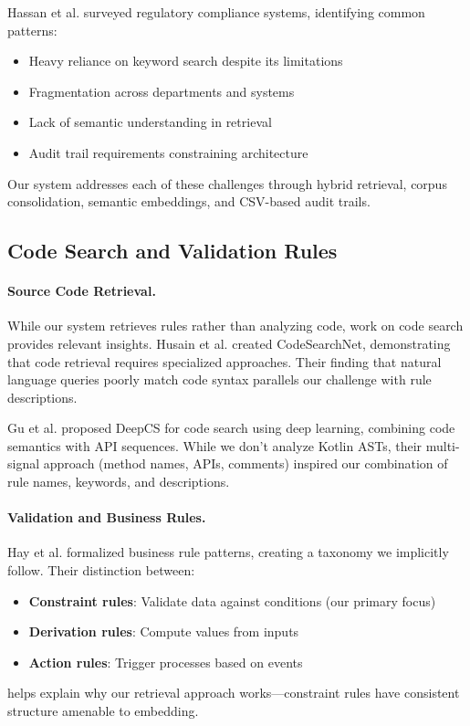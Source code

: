 Hassan et al. \cite{hassan2022regulatory} surveyed regulatory compliance systems, identifying common patterns:
\begin{itemize}[leftmargin=*,itemsep=2pt,topsep=2pt]
 \item Heavy reliance on keyword search despite its limitations
 \item Fragmentation across departments and systems
 \item Lack of semantic understanding in retrieval
 \item Audit trail requirements constraining architecture
\end{itemize}
Our system addresses each of these challenges through hybrid retrieval, corpus consolidation, semantic embeddings, and CSV-based audit trails.

\subsection{Code Search and Validation Rules}

\paragraph{Source Code Retrieval.} While our system retrieves rules rather than analyzing code, work on code search provides relevant insights. Husain et al. \cite{husain2019codesearchnet} created CodeSearchNet, demonstrating that code retrieval requires specialized approaches. Their finding that natural language queries poorly match code syntax parallels our challenge with rule descriptions.

Gu et al. \cite{gu2018deep} proposed DeepCS for code search using deep learning, combining code semantics with API sequences. While we don't analyze Kotlin ASTs, their multi-signal approach (method names, APIs, comments) inspired our combination of rule names, keywords, and descriptions.

\paragraph{Validation and Business Rules.} Hay et al. \cite{hay2006defining} formalized business rule patterns, creating a taxonomy we implicitly follow. Their distinction between:
\begin{itemize}[leftmargin=*,itemsep=2pt,topsep=2pt]
 \item \textbf{Constraint rules}: Validate data against conditions (our primary focus)
 \item \textbf{Derivation rules}: Compute values from inputs
 \item \textbf{Action rules}: Trigger processes based on events
\end{itemize}
helps explain why our retrieval approach works—constraint rules have consistent structure amenable to embedding.

